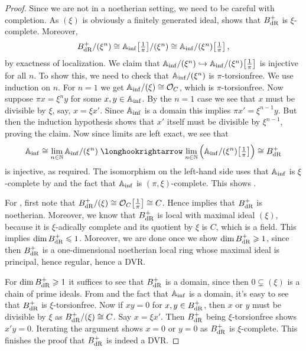 \begin{proof}
	Since we are not in a noetherian setting, we need to be careful with completion. As $(\xi)$ is obviously a finitely generated ideal, \cite[]{stacks-project} shows that $B_{\mathrm{dR}}^+$ is $\xi$-complete. Moreover,
	\begin{equation*}
		B_{\mathrm{dR}}^+/(\xi^n)\cong \mathbb{A}_{\mathrm{inf}}\big[\textstyle\frac1\pi\big]/(\xi^n)\cong \mathbb{A}_{\mathrm{inf}}/(\xi^n)\big[\textstyle\frac1\pi\big]\,,
	\end{equation*}
	by exactness of localization. We claim that $\IA_\inf/(\xi^n)\monomorphism \IA_\inf/(\xi^n)\localize{\pi}$ is injective for all $n$. To show this, we need to check that $\mathbb{A}_{\mathrm{inf}}/(\xi^n)$ is $\pi$-torsionfree. We use induction on $n$. For $n=1$ we get $\mathbb{A}_{\mathrm{inf}}/(\xi)\cong \mathcal{O}_C$, which is $\pi$-torsionfree. Now suppose $\pi x=\xi^ny$ for some $x,y\in\mathbb{A}_{\mathrm{inf}}$. By the $n=1$ case we see that $x$ must be divisible by $\xi$, say, $x=\xi x'$. Since $\mathbb{A}_{\mathrm{inf}}$ is a domain this implies $\pi x'=\xi^{n-1}y$. But then the induction hypothesis shows that $x'$ itself must be divisible by $\xi^{n-1}$, proving the claim.
	Now since limits are left exact, we see that
	\begin{align*}
		\IA_\inf\cong \limit_{n\in \IN}\IA_\inf/(\xi^n)\monomorphism \limit_{n\in\IN}\Big(\IA_\inf/(\xi^n)\localize{\pi}\Big)\cong B_\dR^+
	\end{align*}
	is injective, as required. The isomorphism on the left-hand side uses that $\mathbb{A}_{\mathrm{inf}}$ is $\xi$-complete by \cite[]{stacks-project} and the fact that $\mathbb{A}_{\mathrm{inf}}$ is $(\pi,\xi)$-complete. This shows .
	
	For , first note that $B_{\mathrm{dR}}^+/(\xi)\cong \mathcal{O}_C\big[\textstyle\frac{1}{\pi}\big]\cong C$. Hence \cite[]{stacks-project} implies that $B_{\mathrm{dR}}^+$ is noetherian. Moreover, we know that $B_{\mathrm{dR}}^+$ is local with maximal ideal $(\xi)$, because it is $\xi$-adically complete and its quotient by $\xi$ is $C$, which is a field. This implies $\dim B_{\mathrm{dR}}^+\leqslant 1$. Moreover, we are done once we show $\dim B_{\mathrm{dR}}^+\geqslant 1$, since then $B_{\mathrm{dR}}^+$ is a one-dimensional noetherian local ring whose maximal ideal is principal, hence regular, hence a DVR.
	
	For $\dim B_{\mathrm{dR}}^+\geqslant 1$ it suffices to see that $B_{\mathrm{dR}}^+$ is a domain, since then $0\subsetneq (\xi)$ is a chain of prime ideals. From  and the fact that $\mathbb{A}_{\mathrm{inf}}$ is a domain, it's easy to see that $B_{\mathrm{dR}}^+$ is $\xi$-torsionfree. Now if $xy=0$ for $x,y\in B_{\mathrm{dR}}^+$, then $x$ or $y$ must be divisible by $\xi$ as $B_{\mathrm{dR}}^+/(\xi)\cong C$. Say $x=\xi x'$. Then $B_{\mathrm{dR}}^+$ being $\xi$-torsionfree shows $x'y=0$. Iterating the argument shows $x=0$ or $y=0$ as $B_{\mathrm{dR}}^+$ is $\xi$-complete. This finishes the proof that $B_{\mathrm{dR}}^+$ is indeed a DVR.
	

\end{proof}
